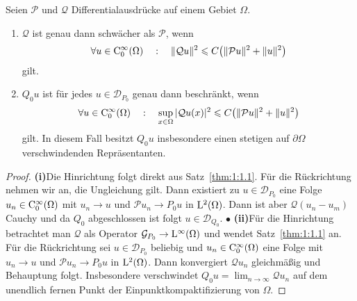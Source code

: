 \begin{lem}\label{lm: Qu stetig}
Seien $\mathcal P$ und $\mathcal Q$ Differentialausdr\"ucke auf einem Gebiet $\Omega$. 
\begin{enumerate}
\item
$\mathcal Q$ ist genau dann schwächer als $\mathcal P$, wenn
\begin{equation}\label{eq:1:1.21}
    \forall u\in\mathrm C^\infty_0(\Omega)\quad:\quad \|\mathcal Qu\|^2 \leqslant C \big( \|\mathcal Pu\|^2 + \|u\|^2 \big)
\end{equation}
gilt.
\item
$Q_0 u$ ist für jedes $u\in\mathcal D_{P_0}$ genau dann beschränkt, wenn
\begin{equation}
    \forall u\in\mathrm C^\infty_0(\Omega)\quad:\quad  \sup_{x\in\Omega} |\mathcal Qu(x) |^2 \leqslant C \big( \|\mathcal Pu\|^2 + \|u\|^2 \big)
\end{equation}
gilt. In diesem Fall besitzt $Q_0u$ insbesondere einen stetigen auf $\partial\Omega$ verschwindenden Repräsentanten.
\end{enumerate}
\end{lem}
\begin{proof}
{\bf (i)}\quad Die Hinrichtung folgt direkt aus Satz~\ref{thm:1:1.1}. Für die Rückrichtung nehmen wir an, die Ungleichung gilt. Dann existiert zu $u\in\mathcal D_{P_0}$ eine Folge $u_n\in\mathrm C_0^\infty(\Omega)$ mit $u_n\to u$ und $\mathcal P u_n\to P_0 u$ in $\mathrm L^2(\Omega)$. Dann ist aber $\mathcal Q(u_n-u_m)$ Cauchy und da $Q_0$ abgeschlossen ist folgt $u\in\mathcal D_{Q_0}$. $\bullet$\qquad
{\bf (ii)}\quad Für die Hinrichtung betrachtet man $\mathcal Q$ als Operator $\mathcal G_{P_0}\to\mathrm L^\infty(\Omega)$ und wendet Satz~\ref{thm:1:1.1} an. Für die Rückrichtung sei $u\in\mathcal D_{P_0}$ beliebig und $u_n\in\mathrm C_0^\infty(\Omega)$ eine Folge mit $u_n\to u$ und $\mathcal Pu_n\to P_0u$ in $\mathrm L^2(\Omega)$.
Dann konvergiert $\mathcal Qu_n$ gleichmäßig und Behauptung folgt. Insbesondere verschwindet $Q_0u = \lim_{n\to\infty} \mathcal Qu_n$ auf dem unendlich fernen Punkt der Einpunktkompaktifizierung von $\Omega$.
\end{proof}

